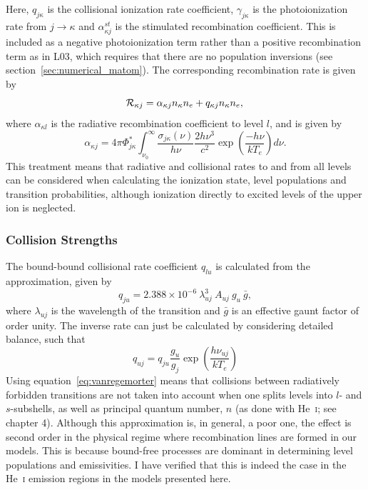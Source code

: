 Here, $q_{j \kappa}$ is the collisional ionization rate coefficient, 
$\gamma_{j \kappa}$ is the photoionization rate
from $j \rightarrow \kappa$ and $\alpha^{st}_{\kappa j}$ is the stimulated recombination
coefficient. This is included as a negative photoionization term rather 
than a positive recombination term as in L03, which requires that there are
no population inversions (see section~\ref{sec:numerical_matom}). 
The corresponding recombination rate is given by 
\begin{equation}
{\cal R}_{\kappa j} = \alpha_{\kappa j} n_{\kappa} n_e + q_{\kappa j}
n_\kappa n_e, \\
\end{equation}
where $\alpha_{\kappa l}$ is the radiative recombination coefficient
to level $l$, and is given by 
\begin{equation}
\alpha_{\kappa j} = 4\pi \Phi^*_{j\kappa} \int^\infty_{\nu_0} 
\frac{\sigma_{j\kappa} (\nu)}{h \nu} \frac{2 h \nu^3}{c^2} 
\exp \left( \frac{- h \nu}{k T_e} \right) d\nu.
\label{eq:alpha_sp}
\end{equation}
This treatment means that radiative and collisional
rates to and from all levels can be considered when calculating the
ionization state, level populations and transition probabilities, 
although ionization directly to excited levels of the upper ion is 
neglected. 

\subsubsection{Collision Strengths}
\label{sec:coll}

The bound-bound collisional rate coefficient $q_{lu}$ is calculated from the
\cite{vanregemorter} approximation, given by
\begin{equation}
q_{ju} = 2.388 \times 10^{-6}~\lambda_{uj}^3~A_{uj}~g_u~\bar{g},
\label{eq:vanregemorter}
\end{equation}
where $\lambda_{uj}$ is the wavelength of the transition and $\bar{g}$ is 
an effective gaunt factor of order unity.
The inverse rate can just be calculated by considering detailed balance, 
such that
\begin{equation}
q_{uj} = q_{ju} \frac{g_u}{g_j} \exp \left( \frac{h \nu_{uj}}{k T_e} \right)
\label{eq:vanregemorter2}
\end{equation}
Using equation~\ref{eq:vanregemorter} means that collisions between radiatively
forbidden transitions are not taken into account when one 
splits levels into $l$- and $s$-subshells, as well
as principal quantum number, $n$ (as done with He~\textsc{i}; 
see chapter 4). Although this approximation is, in general, 
a poor one, the effect is second order in the physical 
regime where recombination lines are formed in our models. 
This is because bound-free processes are dominant in determining 
level populations and emissivities. I have verified that this 
is indeed the case in the He~\textsc{i} emission regions in the models
presented here.

